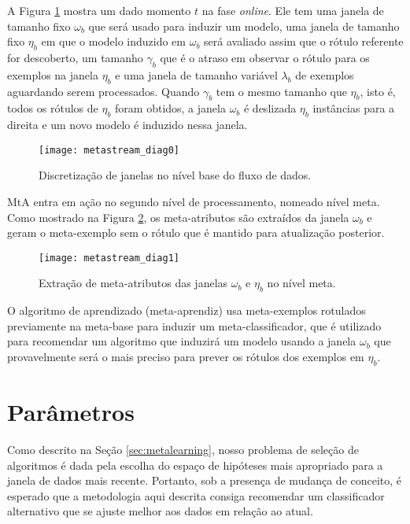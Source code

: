 A Figura \ref{fig:ms_diagram0} mostra um dado momento $t$ na fase \textit{online}. Ele
tem uma janela de tamanho fixo $\omega_b$ que será usado para induzir um
modelo, uma janela de tamanho fixo $\eta_b$ em que o modelo induzido em
$\omega_b$ será avaliado assim que o rótulo referente for descoberto, um
tamanho $\gamma_b$ que é o atraso em observar o rótulo para os exemplos na
janela $\eta_b$ e uma janela de tamanho variável $\lambda_b$ de exemplos
aguardando serem processados.
Quando $\gamma_b$ tem o mesmo tamanho que $\eta_b$, isto é, todos os rótulos de
$\eta_b$ foram obtidos, a janela $\omega_b$ é deslizada $\eta_b$ instâncias
para a direita e um novo modelo é induzido nessa janela.

\begin{figure}[ht]
    \centering
    \texttt{[image: metastream\_diag0]}
    \caption{Discretização de janelas no nível base do fluxo de dados.}
    \label{fig:ms_diagram0}
\end{figure}

MtA entra em ação no segundo nível de processamento, nomeado nível meta. Como
mostrado na Figura \ref{fig:ms_diagram1}, os meta-atributos são extraídos da
janela $\omega_b$ e geram o meta-exemplo sem o rótulo que é mantido para
atualização posterior.

\begin{figure}[ht]
    \centering
    \texttt{[image: metastream\_diag1]}
    \caption{Extração de meta-atributos das janelas  $\omega_b$ e $\eta_b$ no nível meta.}
    \label{fig:ms_diagram1}
\end{figure}

O algoritmo de aprendizado (meta-aprendiz) usa meta-exemplos rotulados
previamente na meta-base para induzir um meta-classificador, que é utilizado
para recomendar um algoritmo que induzirá um modelo usando a janela $\omega_b$
que provavelmente será o mais preciso para prever os rótulos dos exemplos em
$\eta_b$.

\section{Parâmetros}
\label{sec:params}

Como descrito na Seção \ref{sec:metalearning}, nosso problema de seleção de algoritmos é dada pela escolha do espaço de hipóteses mais apropriado para a janela de dados mais recente. Portanto, sob a presença de mudança de conceito, é esperado que a metodologia aqui descrita consiga recomendar um classificador alternativo que se ajuste melhor aos dados em relação ao atual.


